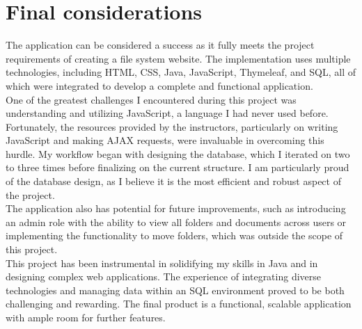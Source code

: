 \documentclass[a4paper,12pt]{article}
\begin{document}
\section{Final considerations}
The application can be considered a success as it fully meets the project requirements of creating a file system website. The implementation uses multiple technologies, including HTML, CSS, Java, JavaScript, Thymeleaf, and SQL, all of which were integrated to develop a complete and functional application.\\
One of the greatest challenges I encountered during this project was understanding and utilizing JavaScript, a language I had never used before. Fortunately, the resources provided by the instructors, particularly on writing JavaScript and making AJAX requests, were invaluable in overcoming this hurdle.
My workflow began with designing the database, which I iterated on two to three times before finalizing on the current structure. I am particularly proud of the database design, as I believe it is the most efficient and robust aspect of the project.\\
The application also has potential for future improvements, such as introducing an admin role with the ability to view all folders and documents across users or implementing the functionality to move folders, which was outside the scope of this project.\\
This project has been instrumental in solidifying my skills in Java and in designing complex web applications. The experience of integrating diverse technologies and managing data within an SQL environment proved to be both challenging and rewarding. The final product is a functional, scalable application with ample room for further features.
        
\end{document}
